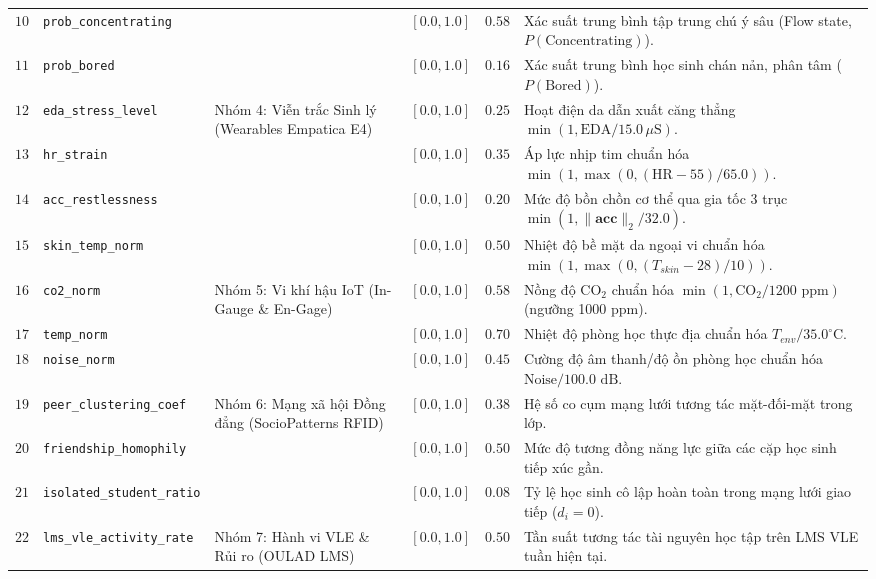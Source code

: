 \begin{table}[htbp]
\begin{tabularx}{\textwidth}{c p{3.6cm} p{3.2cm} c c X}
    $10$ & \texttt{prob\_concentrating} & & $[0.0, 1.0]$ & $0.58$ & Xác suất trung bình tập trung chú ý sâu (Flow state, $P(\text{Concentrating})$). \\
    $11$ & \texttt{prob\_bored} & & $[0.0, 1.0]$ & $0.16$ & Xác suất trung bình học sinh chán nản, phân tâm ($P(\text{Bored})$). \\
    \midrule
    $12$ & \texttt{eda\_stress\_level} & \multirow{4}{3.2cm}{Nhóm 4: Viễn trắc Sinh lý (Wearables Empatica E4)} & $[0.0, 1.0]$ & $0.25$ & Hoạt điện da dẫn xuất căng thẳng $\min(1, \text{EDA} / 15.0\,\mu\text{S})$. \\
    $13$ & \texttt{hr\_strain} & & $[0.0, 1.0]$ & $0.35$ & Áp lực nhịp tim chuẩn hóa $\min(1, \max(0, (\text{HR} - 55) / 65.0))$. \\
    $14$ & \texttt{acc\_restlessness} & & $[0.0, 1.0]$ & $0.20$ & Mức độ bồn chồn cơ thể qua gia tốc 3 trục $\min(1, \|\mathbf{acc}\|_2 / 32.0)$. \\
    $15$ & \texttt{skin\_temp\_norm} & & $[0.0, 1.0]$ & $0.50$ & Nhiệt độ bề mặt da ngoại vi chuẩn hóa $\min(1, \max(0, (T_{skin}-28)/10))$. \\
    \midrule
    $16$ & \texttt{co2\_norm} & \multirow{3}{3.2cm}{Nhóm 5: Vi khí hậu IoT (In-Gauge \& En-Gage)} & $[0.0, 1.0]$ & $0.58$ & Nồng độ $\text{CO}_2$ chuẩn hóa $\min(1, \text{CO}_2 / 1200\text{ ppm})$ (ngưỡng 1000 ppm). \\
    $17$ & \texttt{temp\_norm} & & $[0.0, 1.0]$ & $0.70$ & Nhiệt độ phòng học thực địa chuẩn hóa $T_{env} / 35.0^\circ\text{C}$. \\
    $18$ & \texttt{noise\_norm} & & $[0.0, 1.0]$ & $0.45$ & Cường độ âm thanh/độ ồn phòng học chuẩn hóa $\text{Noise} / 100.0\text{ dB}$. \\
    \midrule
    $19$ & \texttt{peer\_clustering\_coef} & \multirow{3}{3.2cm}{Nhóm 6: Mạng xã hội Đồng đẳng (SocioPatterns RFID)} & $[0.0, 1.0]$ & $0.38$ & Hệ số co cụm mạng lưới tương tác mặt-đối-mặt trong lớp. \\
    $20$ & \texttt{friendship\_homophily} & & $[0.0, 1.0]$ & $0.50$ & Mức độ tương đồng năng lực giữa các cặp học sinh tiếp xúc gần. \\
    $21$ & \texttt{isolated\_student\_ratio} & & $[0.0, 1.0]$ & $0.08$ & Tỷ lệ học sinh cô lập hoàn toàn trong mạng lưới giao tiếp ($d_i = 0$). \\
    \midrule
    $22$ & \texttt{lms\_vle\_activity\_rate} & \multirow{3}{3.2cm}{Nhóm 7: Hành vi VLE \& Rủi ro (OULAD LMS)} & $[0.0, 1.0]$ & $0.50$ & Tần suất tương tác tài nguyên học tập trên LMS VLE tuần hiện tại. \\

\end{tabularx}
\end{table}
